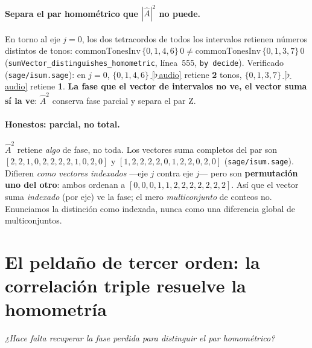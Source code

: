 \documentclass[11pt]{article}
\newcommand{\lean}[1]{\texttt{#1}}
\newcommand{\Ahat}{\hat{A}}
\newcommand{\question}[1]{\smallskip\noindent\textit{#1}\smallskip}
\newcommand{\audiobase}{https://github.com/karlesmarin/music-math/raw/main/media}
\newcommand{\audio}[1]{\href{\audiobase/#1}{\textcolor{ctA}{\footnotesize\,[$\flat$\,audio]}}}
\begin{document}
\paragraph{Separa el par homométrico que $|\Ahat|^2$ no puede.} En torno al eje $j=0$, los dos tetracordos
de todos los intervalos retienen números distintos de tonos:
$\mathrm{commonTonesInv}\,\{0,1,4,6\}\,0\ne\mathrm{commonTonesInv}\,\{0,1,3,7\}\,0$
(\lean{sumVector\_distinguishes\_homometric}, línea~555, \lean{by decide}). Verificado
(\lean{sage/isum.sage}): en $j=0$, $\{0,1,4,6\}$\,\audio{inversion_4z15.wav} retiene \textbf{2} tonos,
$\{0,1,3,7\}$\,\audio{inversion_4z29.wav} retiene \textbf{1}. \textbf{La fase que el vector de intervalos no
ve, el vector suma sí la ve}: $\Ahat^2$ conserva fase parcial y separa el par Z.

\paragraph{Honestos: parcial, no total.} $\Ahat^2$ retiene \emph{algo} de fase, no toda. Los vectores suma
completos del par son $[2,2,1,0,2,2,2,2,1,0,2,0]$ y $[1,2,2,2,2,0,1,2,2,0,2,0]$ (\lean{sage/isum.sage}).
Difieren \emph{como vectores indexados} ---eje $j$ contra eje $j$--- pero son \textbf{permutación uno del
otro}: ambos ordenan a $[0,0,0,1,1,2,2,2,2,2,2,2]$. Así que el vector suma \emph{indexado} (por eje) ve la
fase; el mero \emph{multiconjunto} de conteos no. Enunciamos la distinción como indexada, nunca como una
diferencia global de multiconjuntos.

\section{El peldaño de tercer orden: la correlación triple resuelve la homometría}\label{sec:triple}

\question{¿Hace falta recuperar la fase perdida para distinguir el par homométrico?}
\end{document}
